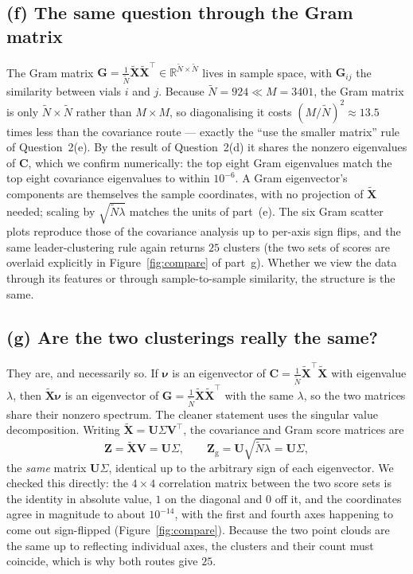 \documentclass[12pt,a4paper]{article}
\theoremstyle{definition}
\newcommand{\T}{^{\!\top}}
\newcommand{\R}{\mathbb{R}}
\newcommand{\Xt}{\widetilde{\mathbf X}}
\newcommand{\Nt}{\widetilde{N}}
\begin{document}
\subsection{(f) The same question through the Gram matrix}
The Gram matrix $\mathbf G=\tfrac1\Nt\Xt\Xt\T\in\R^{\Nt\times\Nt}$ lives in sample space, with
$\mathbf G_{ij}$ the similarity between vials $i$ and $j$. Because $\Nt=924\ll M=3401$, the Gram
matrix is only $\Nt\times\Nt$ rather than $M\times M$, so diagonalising it costs $(M/\Nt)^2\approx
13.5$ times less than the covariance route --- exactly the ``use the smaller matrix'' rule of
Question~2(e). By the result of Question~2(d) it shares the nonzero eigenvalues of $\mathbf C$, which
we confirm numerically: the top eight Gram eigenvalues match the top eight covariance eigenvalues to
within $10^{-6}$. A Gram eigenvector's components are
themselves the sample coordinates, with no projection of $\Xt$ needed; scaling by $\sqrt{\Nt\lambda}$
matches the units of part~(e). The six Gram scatter plots reproduce those of the covariance analysis
up to per-axis sign flips, and the same leader-clustering rule again returns $25$ clusters (the two
sets of scores are overlaid explicitly in Figure~\ref{fig:compare} of part~g). Whether we view the
data through its features or through sample-to-sample similarity, the structure is the same.

\subsection{(g) Are the two clusterings really the same?}
They are, and necessarily so. If $\bm\nu$ is an eigenvector of
$\mathbf C=\tfrac1\Nt\Xt\T\Xt$ with eigenvalue $\lambda$, then $\Xt\bm\nu$ is an eigenvector of
$\mathbf G=\tfrac1\Nt\Xt\Xt\T$ with the same $\lambda$, so the two matrices share their nonzero
spectrum. The cleaner statement uses the singular value decomposition. Writing
$\Xt=\mathbf U\Sigma\mathbf V\T$, the covariance and Gram score matrices are
\begin{equation}
  \mathbf Z=\Xt\mathbf V=\mathbf U\Sigma,\qquad
  \mathbf Z_{\mathrm g}=\mathbf U\sqrt{\Nt\lambda}=\mathbf U\Sigma ,
\end{equation}
the \emph{same} matrix $\mathbf U\Sigma$, identical up to the arbitrary sign of each
eigenvector. We checked this directly: the $4\times4$ correlation matrix between the two score sets
is the identity in absolute value, $1$ on the diagonal and $0$ off it, and the coordinates agree in
magnitude to about $10^{-14}$, with the first and fourth axes happening to come out sign-flipped
(Figure~\ref{fig:compare}). Because the two point clouds are the same up to reflecting individual
axes, the clusters and their count must coincide, which is why both routes give $25$.
\end{document}
